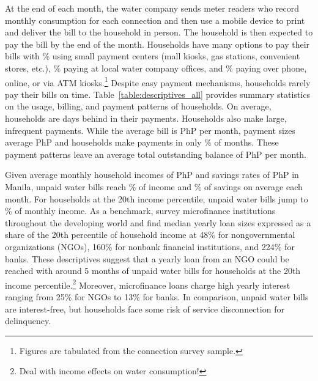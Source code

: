 \documentclass[12pt]{article}
\begin{document}
At the end of each month, the water company sends meter readers who record monthly consumption for each connection and then use a mobile device to print and deliver the bill to the household in person.  The household is then expected to pay the bill by the end of the month.  Households have many options to pay their bills with \unskip\% using small payment centers (mall kiosks, gas stations, convenient stores, etc.), \unskip\% paying at local water company offices, and \unskip\% paying over phone, online, or via ATM kiosks.\footnote{Figures are tabulated from the connection survey sample.}  Despite easy payment mechanisms, households rarely pay their bills on time.  Table~\ref{table:descriptives_all} provides summary statistics on the usage, billing, and payment patterns of households.  On average, households are days behind in their payments.  Households also make large, infrequent payments.  While the average bill is PhP per month, payment sizes average PhP and households make payments in only \unskip\% of months.  These payment patterns leave an average total outstanding balance of PhP per month.  

Given average monthly household incomes of PhP and savings rates of PhP in Manila, unpaid water bills reach \unskip\% of income and \unskip\% of savings on average each month.  For households at the 20th income percentile, unpaid water bills jump to \unskip\% of monthly income.  As a benchmark, \cite{cull2009microfinance} survey microfinance institutions throughout the developing world and find median yearly loan sizes expressed as a share of the 20th percentile of household income at 48\% for nongovernmental organizations (NGOs), 160\% for nonbank financial institutions, and 224\% for banks.  These descriptives suggest that a yearly loan from an NGO could be reached with around 5 months of unpaid water bills for households at the 20th income percentile.\footnote{Deal with income effects on water consumption!}  Moreover, microfinance loans charge high yearly interest ranging from 25\% for NGOs to 13\% for banks.  In comparison, unpaid water bills are interest-free, but households face some risk of service disconnection for delinquency.
\end{document}
